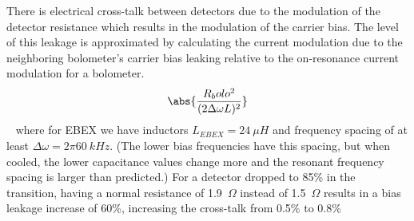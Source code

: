 

There is electrical cross-talk between detectors due to the modulation of the detector resistance which results in the modulation of the carrier bias. 
The level of this leakage is approximated by calculating the current modulation due to the neighboring bolometer's carrier bias leaking relative to the on-resonance current modulation for a bolometer. 
\begin{equation}
\abs{\frac{R_bolo^2}{(2\Delta \omega L)^2}}
\end{equation}
~\citep{Dobbs2011}
where for \ac{EBEX} we have inductors $L_{EBEX} = 24~\mu H$ and frequency spacing of at least $\Delta \omega = 2\pi 60~kHz$. 
(The lower bias frequencies have this spacing, but when cooled, the lower capacitance values change more and the resonant frequency spacing is larger than predicted.)
For a detector dropped to 85\% in the transition, having a normal resistance of 1.9~$\Omega$ instead of 1.5~$\Omega$ results in a bias leakage increase of 60\%, increasing the cross-talk from 0.5\% to 0.8\%


